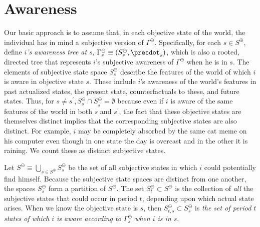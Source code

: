 \documentclass[
11pt,
titlepage,
reqno,
]{article}%
\theoremstyle{definition}
\begin{document}
\section{Awareness}
Our basic approach is to assume that, in each objective state of the world, the individual has in mind a subjective version of $\Gamma^\oplus$. 
Specifically, for each $s\in S^\oplus$, define \textit{$i$'s awareness tree at $s$}, $\Gamma^\ominus_s\equiv(S^\ominus_s,\precdot_s)$, which is also a rooted, directed tree that represents $i$'s subjective awareness of $\Gamma^\oplus$ when he is in $s$.
The elements of subjective state space $S^\ominus_s$ describe the features of the world of which $i$ is aware in objective state $s$.
These include $i$'s awareness of the world's features in past actualized states, the present state, counterfactuals to these, and future states.
Thus, for $s\ne s^\prime,S^\ominus_s\cap S^\ominus_{s^\prime}=\emptyset$ because even if $i$ is aware of the same features of the world in both $s$ and $s^\prime$, the fact that these objective states are themselves distinct implies that the corresponding subjective states are also distinct.
For example, $i$ may be completely absorbed by the same cat meme on his computer even though in one state the day is overcast and in the other it is raining. 
We count these as distinct subjective states.

Let $S^\ominus\equiv \bigcup_{s\in S^\oplus}S^\ominus_s$ be the set of all subjective states in which $i$ could potentially find himself.
Because the subjective state spaces are distinct from one another, the spaces $S^\ominus_s$ form a partition of $S^\ominus$.
The set $S^\ominus_t\subset S^\ominus$ is the collection of \textit{all} the subjective states that could occur in period $t$, depending upon which actual state arises.
When we know the objective state is $s$, then $S^\ominus_{t,s}\subset S^\ominus_s$ is \textit{the set of period $t$ states of which $i$ is aware according to $\Gamma^\ominus_s$ when $i$ is in $s$}.
\end{document}
